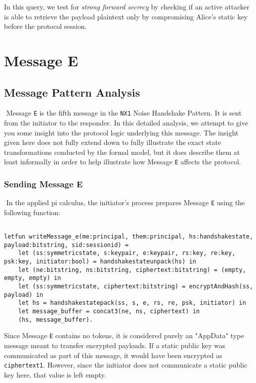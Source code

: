 In this query, we test for \emph{strong forward secrecy} by checking if an active attacker is able to retrieve the payload plaintext only by compromising Alice's static key before the protocol session.


\section{ Message E}

\subsection{Message Pattern Analysis}$ $
Message \texttt{E} is the fifth message in the \texttt{NX1} Noise Handshake Pattern. It is sent from the initiator to the responder. In this detailed analysis, we attempt to give you some insight into the protocol logic underlying this message. The insight given here does not fully extend down to fully illustrate the exact state transformations conducted by the formal model, but it does describe them at least informally in order to help illustrate how Message \texttt{E} affects the protocol.


\subsubsection{Sending Message E}$ $
In the applied pi calculus, the initiator's process prepares Message \texttt{E} using the following function:


\begin{lstlisting}

letfun writeMessage_e(me:principal, them:principal, hs:handshakestate, payload:bitstring, sid:sessionid) =
	let (ss:symmetricstate, s:keypair, e:keypair, rs:key, re:key, psk:key, initiator:bool) = handshakestateunpack(hs) in
	let (ne:bitstring, ns:bitstring, ciphertext:bitstring) = (empty, empty, empty) in
	let (ss:symmetricstate, ciphertext:bitstring) = encryptAndHash(ss, payload) in
	let hs = handshakestatepack(ss, s, e, rs, re, psk, initiator) in
	let message_buffer = concat3(ne, ns, ciphertext) in
	(hs, message_buffer).

\end{lstlisting}

Since Message \texttt{E} contains no tokens, it is considered purely an "AppData" type message meant to transfer encrypted payloads.
If a static public key was communicated as part of this message, it would have been encrypted as \texttt{ciphertext1}. However, since the initiator does not communicate a static public key here, that value is left empty.


